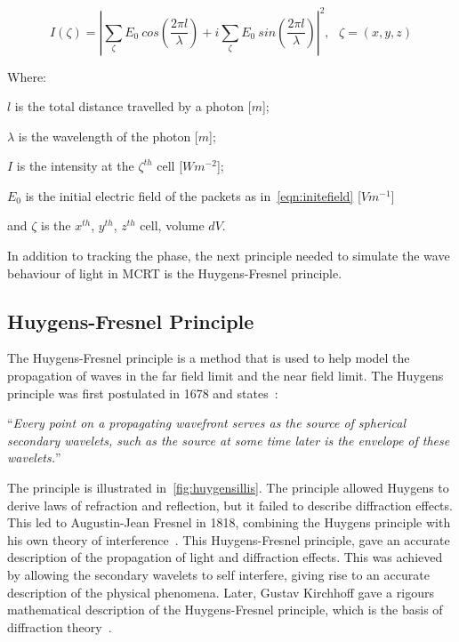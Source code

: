 \begin{equation}
I(\zeta)= \left| \sum\limits_{\zeta}E_0\ cos\left(\frac{2\pi l}{\lambda}\right) + i \sum\limits_{\zeta}E_0\ sin\left(\frac{2\pi l}{\lambda}\right)\right|^2,\ \ \ \zeta=(x,y,z)
\label{eqn:intense}
\end{equation}

\noindent Where:

\indent $l$ is the total distance travelled by a photon [$m$];

\indent $\lambda$ is the wavelength of the photon [$m$];

\indent $I$ is the intensity at the $\zeta^{th}$ cell [$W m^{-2}$];

\indent $E_0$ is the initial electric field of the packets as in~\cref{eqn:initefield} [$Vm^{-1}$]

\indent and $\zeta$ is the $x^{th}$, $y^{th}$, $z^{th}$ cell, volume $dV$.

\medskip

In addition to tracking the phase, the next principle needed to simulate the wave behaviour of light in MCRT is the Huygens-Fresnel principle.

\subsection{Huygens-Fresnel Principle}

The Huygens-Fresnel principle is a method that is used to help model the propagation of waves in the far field limit and the near field limit. 
The Huygens principle was first postulated in 1678 and states~\cite{huygens2012treatise,hecht2017optics,huygens1900wave}: 

\medskip

``\textit{Every point on a propagating wavefront serves as the source of spherical secondary wavelets, such as the source at some time later is the envelope of these wavelets.}''

\medskip

The principle is illustrated in~\cref{fig:huygensillis}.
The principle allowed Huygens to derive laws of refraction and reflection, but it failed to describe diffraction effects.
This led to Augustin-Jean Fresnel in 1818, combining the Huygens principle with his own theory of interference~\cite{fresnel1819memoire,huygens1900wave}.
This Huygens-Fresnel principle, gave an accurate description of the propagation of light and diffraction effects.
This was achieved by allowing the secondary wavelets to self interfere, giving rise to an accurate description of the physical phenomena.
Later, Gustav Kirchhoff gave a rigours mathematical description of the Huygens-Fresnel principle, which is the basis of diffraction theory~\cite{kirchhoff1883ann,born2000principles}. 

